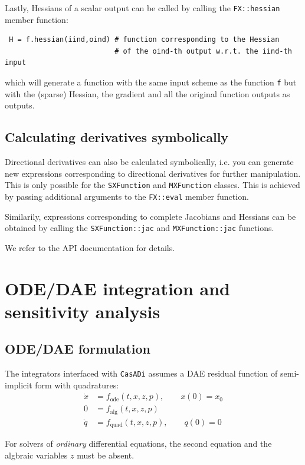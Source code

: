 \documentclass[a4paper,12pt]{book}
\newcommand{\CasADi}{\texttt{CasADi}\xspace}
\begin{document}
Lastly, Hessians of a scalar output can be called by calling the \texttt{FX::hessian} member function:
\begin{verbatim}
 H = f.hessian(iind,oind) # function corresponding to the Hessian
                          # of the oind-th output w.r.t. the iind-th input
\end{verbatim}
which will generate a function with the same input scheme as the function \texttt{f} but with the (sparse) Hessian, the gradient and all the original function outputs as outputs.

\section{Calculating derivatives symbolically}
Directional derivatives can also be calculated symbolically, i.e. you can generate new expressions corresponding to directional derivatives for further manipulation. This is only possible for the \texttt{SXFunction} and \texttt{MXFunction} classes.
This is achieved by passing additional arguments to the \texttt{FX::eval} member function.

Similarily, expressions corresponding to complete Jacobians and Hessians can be obtained by calling the \texttt{SXFunction::jac} and \texttt{MXFunction::jac} functions.

We refer to the API documentation for details.

\chapter{ODE/DAE integration and sensitivity analysis} \label{chapter:integrators}
\section{ODE/DAE formulation}
The integrators interfaced with \CasADi assumes a DAE residual function of semi-implicit form with quadratures:
\begin{subequations}
\begin{align}
 \dot{x} &= f_{\text{ode}}(t,x,z,p), \qquad x(0) = x_0 \\
      0  &= f_{\text{alg}}(t,x,z,p) \\
 \dot{q} &= f_{\text{quad}}(t,x,z,p), \qquad q(0) = 0
\end{align}
\end{subequations}

For solvers of \emph{ordinary} differential equations, the second equation and the algbraic variables $z$ must be absent.
\end{document}
